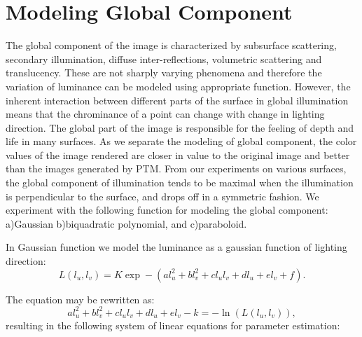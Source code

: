 \section{Modeling Global Component}

The global component of the image is characterized by subsurface scattering,
secondary illumination, diffuse inter-reflections, volumetric scattering and
translucency. These are not sharply varying phenomena and therefore the
variation of luminance can be modeled using appropriate function. However, the
inherent interaction between different parts of the surface in global
illumination means that the chrominance of a point can change with change in
lighting direction. The global part of the image is responsible for the feeling
of depth and life in many surfaces. As we separate the modeling of global
component, the color values of the image rendered are closer in value to the
original image and better than the images generated by PTM. From our experiments
on various surfaces, the global component of illumination tends to be maximal
when the illumination is perpendicular to the surface, and drops off in a
symmetric fashion. We experiment with the following function for modeling the
global component: a)Gaussian b)biquadratic polynomial, and c)paraboloid.


In Gaussian function we model the luminance as a gaussian function of lighting
direction:
\begin{equation}
L(l_u,l_v)=K\exp-(al_u^2 + bl_v^2 + cl_ul_v + dl_u + el_v +f  ).
\end{equation}

The equation may be rewritten as:
\begin{equation}
al_u^2 + bl_v^2 + cl_ul_v + dl_u + el_v -k= -\ln(L(l_u,l_v)),
\end{equation}
resulting in the following system of linear equations for parameter estimation:

